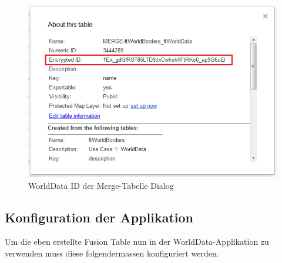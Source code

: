 \begin{figure}[H]
	\centering
	\includegraphics[scale=0.8]{images/usecase1-worlddata/documentation/worlddata-prepare_fusiontableslayer4.png}
	\caption{WorldData ID der Merge-Tabelle Dialog}
	\label{worlddata-prepare_fusiontableslayer4}
\end{figure}

\subsection{Konfiguration der Applikation}
Um die eben erstellte Fusion Table nun in der WorldData-Applikation zu verwenden muss diese folgendermassen konfiguriert werden.

